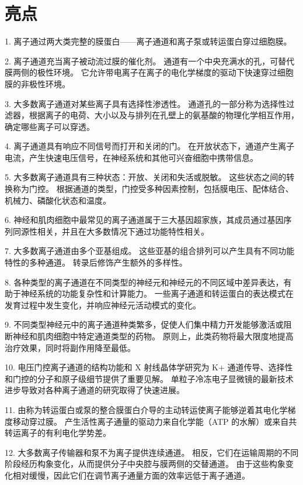 \section{亮点}


1. 离子通过两大类完整的膜蛋白——离子通道和离子泵或转运蛋白穿过细胞膜。


2. 离子通道充当离子被动流过膜的催化剂。
通道有一个中央充满水的孔，可替代膜两侧的极性环境。 
它允许带电离子在离子的电化学梯度的驱动下快速穿过细胞膜的非极性环境。


3. 大多数离子通道对某些离子具有选择性渗透性。
通道孔的一部分称为选择性过滤器，根据离子的电荷、大小以及与排列在孔壁上的氨基酸的物理化学相互作用，确定哪些离子可以穿透。


4. 离子通道具有响应不同信号而打开和关闭的门。
在开放状态下，通道产生离子电流，产生快速电压信号，在神经系统和其他可兴奋细胞中携带信息。


5. 大多数离子通道具有三种状态：开放、关闭和失活或脱敏。
这些状态之间的转换称为门控。
根据通道的类型，门控受多种因素控制，包括膜电压、配体结合、机械力、磷酸化状态和温度。


6. 神经和肌肉细胞中最常见的离子通道属于三大基因超家族，其成员通过基因序列同源性相关，并且在大多数情况下通过功能特性相关。


7. 大多数离子通道由多个亚基组成。
这些亚基的组合排列可以产生具有不同功能特性的多种通道。 转录后修饰产生额外的多样性。


8. 各种类型的离子通道在不同类型的神经元和神经元的不同区域中差异表达，有助于神经系统的功能复杂性和计算能力。
一些离子通道和转运蛋白的表达模式在发育过程中发生变化，并响应神经元活动模式的变化。


9. 不同类型神经元中的离子通道种类繁多，促使人们集中精力开发能够激活或阻断神经和肌肉细胞中特定通道类型的药物。
原则上，此类药物将最大限度地提高治疗效果，同时将副作用降至最低。


10. 电压门控离子通道的结构功能和 X 射线晶体学研究为 K+ 通道传导、选择性和门控的分子和原子级细节提供了重要见解。
单粒子冷冻电子显微镜的最新技术进步导致对各种离子通道的研究取得了快速进展。


11. 由称为转运蛋白或泵的整合膜蛋白介导的主动转运使离子能够逆着其电化学梯度移动穿过膜。
产生活性离子通量的驱动力来自化学能（ATP 的水解）或来自共转运离子的有利电化学势差。


12. 大多数离子传输器和泵不为离子提供连续通道。
相反，它们在运输周期的不同阶段经历构象变化，从而提供分子中央腔与膜两侧的交替通道。
由于这些构象变化相对缓慢，因此它们在调节离子通量方面的效率远低于离子通道。



